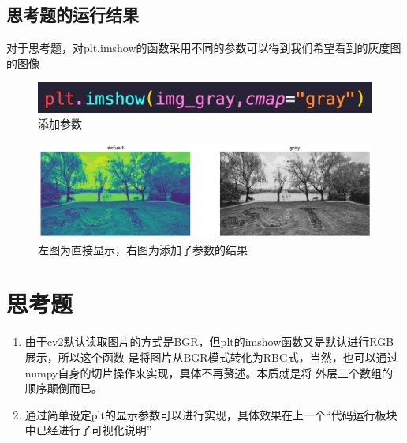 \documentclass[UTF8]{ctexart}
\begin{document}
        \subsection{思考题的运行结果}
            对于思考题，对plt.imshow的函数采用不同的参数可以得到我们希望看到的灰度图的图像
            \begin{figure}[H]
                \centering
                \includegraphics[scale=0.6]{img/show.png}
                \caption{添加参数}
            \end{figure}
            \begin{figure}[H]
                \centering
                \includegraphics[scale=0.4]{img/feature/comparison.jpg}
                \caption{左图为直接显示，右图为添加了参数的结果}
            \end{figure}

    \section{思考题}
    \begin{enumerate}
        \item 由于cv2默认读取图片的方式是BGR，但plt的imshow函数又是默认进行RGB展示，所以这个函数
        是将图片从BGR模式转化为RBG式，当然，也可以通过numpy自身的切片操作来实现，具体不再赘述。本质就是将
        外层三个数组的顺序颠倒而已。
        \item 通过简单设定plt的显示参数可以进行实现，具体效果在上一个“代码运行板块中已经进行了可视化说明”
    \end{enumerate}
\end{document}
